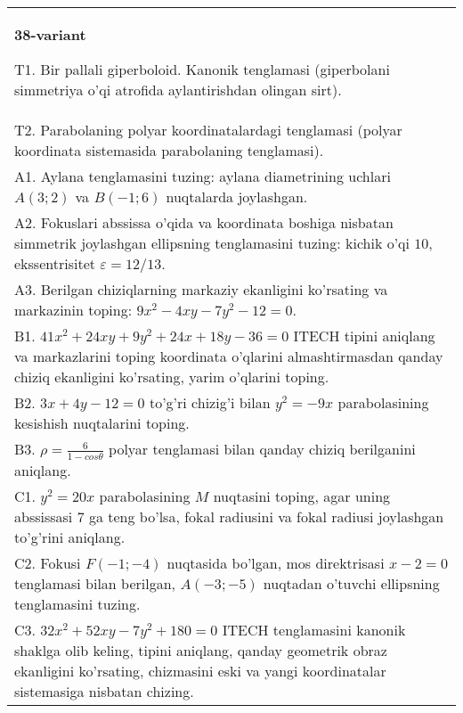 \documentclass{article}
\begin{document}
\begin{tabular}{m{17cm}}
\textbf{38-variant}
\newline

T1. Bir pallali giperboloid. Kanonik tenglamasi (giperbolani simmetriya o'qi atrofida aylantirishdan olingan sirt).\\

T2. Parabolaning polyar koordinatalardagi tenglamasi (polyar koordinata sistemasida parabolaning tenglamasi).\\

A1. Aylana tenglamasini tuzing: aylana diametrining uchlari $A(3;2)$ va $B(-1;6)$ nuqtalarda joylashgan.\\

A2. Fokuslari abssissa o'qida va koordinata boshiga nisbatan simmetrik joylashgan ellipsning tenglamasini tuzing: kichik o'qi $10$, ekssentrisitet $\varepsilon=12/13$.\\

A3. Berilgan chiziqlarning markaziy ekanligini ko'rsating va markazinin toping: $9x^{2}-4xy-7y^{2}-12=0$.\\

B1. $41x^{2} + 24xy + 9y^{2} + 24x + 18y - 36 = 0$ ITECH tipini aniqlang va markazlarini toping koordinata o'qlarini almashtirmasdan qanday chiziq ekanligini ko'rsating, yarim o'qlarini toping.  \\

B2. $3x + 4y - 12 = 0$ to'g'ri chizig'i bilan $y^{2} = - 9x$ parabolasining kesishish nuqtalarini toping.  \\

B3. $\rho = \frac{6}{1 - cos\theta}$ polyar tenglamasi bilan qanday chiziq berilganini aniqlang.  \\

C1. $y^{2} = 20x$ parabolasining $M$ nuqtasini toping, agar uning abssissasi 7 ga teng bo'lsa, fokal radiusini va fokal radiusi joylashgan to'g'rini aniqlang.\\

C2. Fokusi $F( - 1; - 4)$ nuqtasida bo'lgan, mos direktrisasi $x - 2 = 0$ tenglamasi bilan berilgan, $A( - 3; - 5)$ nuqtadan o'tuvchi ellipsning tenglamasini tuzing.  \\

C3. $32x^{2} + 52xy - 7y^{2} + 180 = 0$ ITECH tenglamasini kanonik shaklga olib keling, tipini aniqlang, qanday geometrik obraz ekanligini ko'rsating, chizmasini eski va yangi koordinatalar sistemasiga nisbatan chizing.  \\

\end{tabular}
\vspace{1cm}
\end{document}
